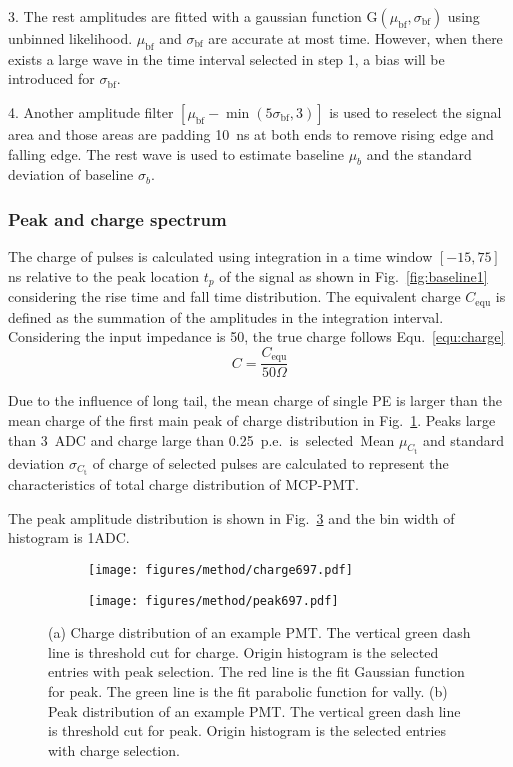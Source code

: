 3. The rest amplitudes are fitted with a gaussian function G$(\mu_{\mathrm{bf}},\sigma_{\mathrm{bf}})$ using unbinned likelihood. $\mu_{\mathrm{bf}}$ and $\sigma_{\mathrm{bf}}$ are accurate at most time. However, when there exists a large wave in the time interval selected in step 1, a bias will be introduced for $\sigma_{\mathrm{bf}}$.

4. Another amplitude filter $[\mu_{\mathrm{bf}}-\min(5\sigma_{\mathrm{bf}},3)]$ is used to reselect the signal area and those areas are padding \SI{10}{ns} at both ends to remove rising edge and falling edge. The rest wave is used to estimate baseline $\mu_b$ and the standard deviation of baseline $\sigma_b$.

\subsubsection{Peak and charge spectrum}
\label{sec:noisepeak}

The charge of pulses is calculated using integration in a time window $[-15, 75]$\,ns relative to the peak location $t_p$ of the signal as shown in Fig.~\ref{fig:baseline1} considering the rise time and fall time distribution. The equivalent charge $C_{\mathrm{equ}}$ is defined as the summation of the amplitudes in the integration interval. Considering the input impedance is \SI{50}{\Omega}, the true charge follows Equ.~\eqref{equ:charge} 
\begin{equation}
    \label{equ:charge}
    C = \frac{C_{\mathrm{equ}}}{50 \Omega}
\end{equation}

Due to the influence of long tail, the mean charge of single PE is larger than the mean charge of the first main peak of charge distribution in Fig.~\ref{fig:charge}. Peaks large than \SI{3}{ADC} and charge large than \SI{0.25}{p.e.} is selected. Mean $\mu_{C_{\mathrm{t}}}$ and standard deviation $\sigma_{C_{\mathrm{t}}}$ of charge of selected pulses are calculated to represent the characteristics of total charge distribution of MCP-PMT.

The peak amplitude distribution is shown in Fig.~\ref{fig:peak} and the bin width of histogram is 1ADC.
\begin{figure}[!htbp]
    \centering
    \begin{subfigure}[t]{0.49\textwidth}
        \texttt{[image: figures/method/charge697.pdf]}
        \caption{}%
        \label{fig:charge}
    \end{subfigure}
    \begin{subfigure}[t]{0.49\textwidth}
        \texttt{[image: figures/method/peak697.pdf]}
        \caption{}%
        \label{fig:peak}
    \end{subfigure}
    \caption{(a) Charge distribution of an example PMT. The vertical green dash line is threshold cut for charge. Origin histogram is the selected entries with peak selection. The red line is the fit Gaussian function for peak. The green line is the fit parabolic function for vally. (b) Peak distribution of an example PMT. The vertical green dash line is threshold cut for peak. Origin histogram is the selected entries with charge selection.}
\end{figure}
